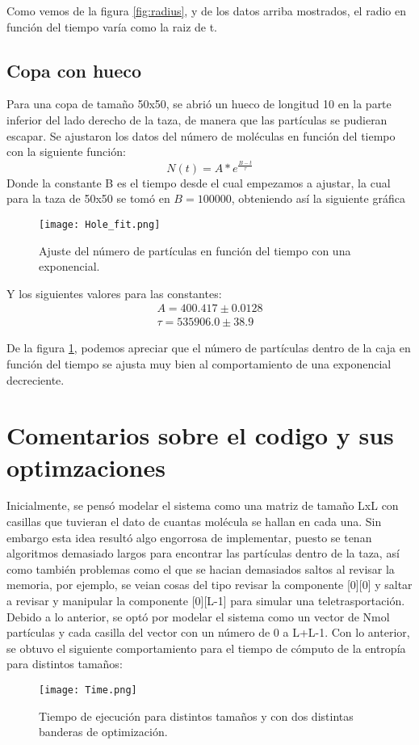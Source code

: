 \documentclass{article}
\begin{document}
  Como vemos de la figura \ref{fig:radius}, y de los datos arriba mostrados, el radio en función del tiempo varía como la raiz de t.
  
    
  
\subsection{Copa con hueco}
Para una copa de tamaño 50x50, se abrió un hueco de longitud 10 en la parte inferior del lado derecho de la taza, de manera que las partículas se pudieran escapar. Se ajustaron los datos del número de moléculas en función del tiempo con la siguiente función:
\begin{equation}
    N(t)= A*e^{\frac{B-t}{\tau}}
\end{equation}
Donde la constante B es el tiempo desde el cual empezamos a ajustar, la cual para la taza de 50x50 se tomó en $B=100000$, obteniendo así la siguiente gráfica
\begin{figure}[H]
   \centering
   \texttt{[image: Hole\_fit.png]}
   \caption{Ajuste del número de partículas en función del tiempo con una exponencial.}
   \label{fig:hole}
 \end{figure}
Y los siguientes valores para las constantes:
\begin{align}
    A= 400.417 \pm 0.0128 \\
    \tau = 535906.0 \pm 38.9
\end{align}

De la figura \ref{fig:hole}, podemos apreciar que el número de partículas dentro de la caja en función del tiempo se ajusta muy bien al comportamiento de una exponencial decreciente.


\section{Comentarios sobre el codigo y sus optimzaciones}

Inicialmente, se pensó modelar el sistema como una matriz de tamaño LxL con casillas que tuvieran el dato de cuantas molécula se hallan en cada una. Sin embargo esta idea resultó algo engorrosa de implementar, puesto se tenan algoritmos demasiado largos para encontrar las partículas dentro de la taza, así como también problemas como el que se hacian demasiados saltos al revisar la memoria, por ejemplo, se veian cosas del tipo revisar la componente [0][0] y saltar a revisar y manipular la componente [0][L-1] para simular una teletrasportación. Debido a lo anterior, se optó por modelar el sistema como un vector de Nmol partículas y cada casilla del vector con un número de 0 a L+L-1. Con lo anterior, se obtuvo el siguiente comportamiento para el tiempo de cómputo de la entropía para distintos tamaños:

\begin{figure}[H]
   \centering
   \texttt{[image: Time.png]}
   \caption{Tiempo de ejecución para distintos tamaños y con dos distintas banderas de optimización.}
   \label{fig:performance}
 \end{figure}
\end{document}
